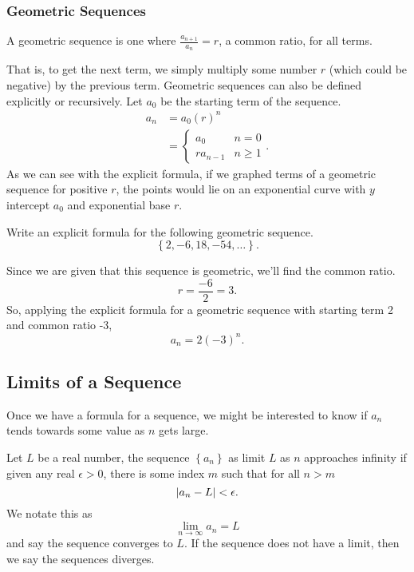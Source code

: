 \subsubsection{Geometric Sequences}
\begin{definition}
	A geometric sequence is one where $\frac{a_{n+1}}{a_n} = r$, a common ratio, for all terms.
\end{definition}
\noindent
That is, to get the next term, we simply multiply some number $r$ (which could be negative) by the previous term.
Geometric sequences can also be defined explicitly or recursively.
Let $a_0$ be the starting term of the sequence.
\begin{align*}
	a_n &= a_0(r)^n \\
	&= \begin{cases}
		a_0 & n = 0 \\
		ra_{n-1} & n \geq 1
	\end{cases}.
\end{align*}
\noindent
As we can see with the explicit formula, if we graphed terms of a geometric sequence for positive $r$, the points would lie on an exponential curve with $y$ intercept $a_0$ and exponential base $r$.

\begin{example}
	Write an explicit formula for the following geometric sequence.
	\begin{equation*}
		\left\{2,-6,18,-54,\ldots\right\}.
	\end{equation*}
\end{example}
Since we are given that this sequence is geometric, we'll find the common ratio.
\begin{equation*}
	r = \frac{-6}{2} = 3.
\end{equation*}
\indent
So, applying the explicit formula for a geometric sequence with starting term 2 and common ratio -3,
\begin{equation*}
	a_n = 2(-3)^n.
\end{equation*}

\subsection{Limits of a Sequence}
Once we have a formula for a sequence, we might be interested to know if $a_n$ tends towards some value as $n$ gets large.
\begin{definition}
	Let $L$ be a real number, the sequence $\left\{a_n\right\}$ as limit $L$ as $n$ approaches infinity if given any real $\epsilon > 0$, there is some index $m$ such that for all $n > m$
	\begin{equation*}
		\lvert a_n - L \rvert < \epsilon.
	\end{equation*}
	We notate this as 
	\begin{equation*}
		\lim_{n\to\infty}{a_n} = L
	\end{equation*}
	and say the sequence converges to $L$.
	If the sequence does not have a limit, then we say the sequences diverges.
\end{definition}

